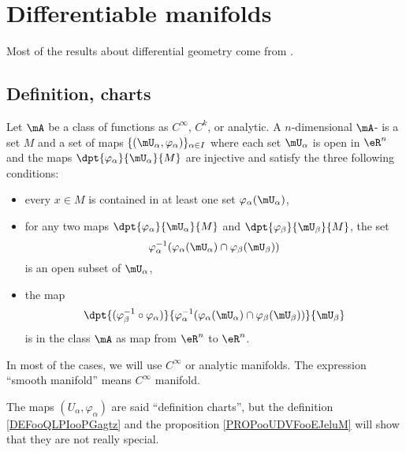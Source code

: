 
\section{Differentiable manifolds}

Most of the results about differential geometry come from \cite{kobayashi, madore, Helgason, ms_book, dgbook}.

\subsection{Definition, charts}

\begin{definition}
	Let \( \mA\) be a class of functions as \(  C^{\infty}\), \( C^k\), or analytic. A $n$-dimensional \( \mA\)- is a set $M$ and a set of maps $\{(\mU_{\alpha},\varphi_{\alpha})\}_{\alpha\in I}$ where each set $\mU_{\alpha}$ is open in $\eR^n$ and the maps $\dpt{\varphi_{\alpha}}{\mU_{\alpha}}{M}$ are injective and satisfy the three following conditions:

	\begin{itemize}
		\item every $x\in M$ is contained in at least one set $\varphi_{\alpha}(\mU_{\alpha})$,
		\item for any two maps $\dpt{\varphi_{\alpha}}{\mU_{\alpha}}{M}$ and $\dpt{\varphi_{\beta}}{\mU_{\beta}}{M}$, the set
		      \[
			      \varphi_{\alpha}^{-1}( \varphi_{\alpha}(\mU_{\alpha})\cap\varphi_{\beta}(\mU_{\beta}) )
		      \]
		      is an open subset of $\mU_{\alpha}$,
		\item the map
		      \[
			      \dpt{  (\varphi_{\beta}^{-1}\circ\varphi_{\alpha})  }{   \varphi_{\alpha}^{-1}( \varphi_{\alpha}(\mU_{\alpha})\cap\varphi_{\beta}(\mU_{\beta})  )   }{\mU_{\beta}}
		      \]
		      is in the class \( \mA\) as map from $\eR^n$ to $\eR^n$.
	\end{itemize}
	In most of the cases, we will use \(  C^{\infty}\) or analytic manifolds. The expression ``smooth manifold'' means \(  C^{\infty}\) manifold.

	The maps \( (U_{\alpha}, \varphi_{\alpha})\) are said ``definition charts'', but the definition \ref{DEFooQLPIooPGagtz} and the proposition \ref{PROPooUDVFooEJeluM} will show that they are not really special.
\end{definition}

